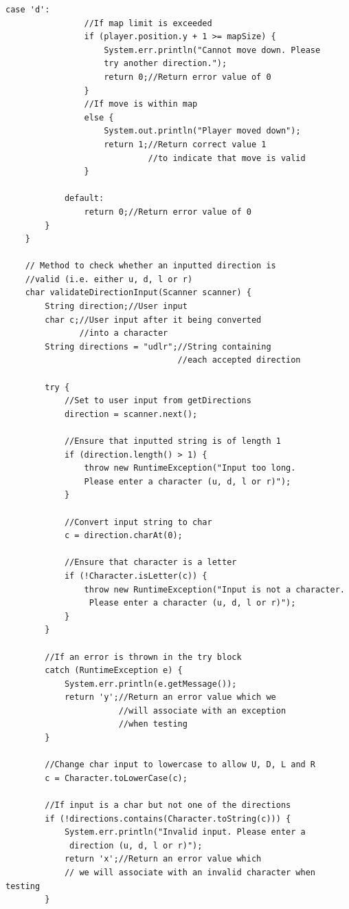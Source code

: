 \documentclass[a4paper,12pt]{extarticle}
\begin{document}
\begin{lstlisting}[caption=The initial code of the Game class, label=amb]
            case 'd':
                //If map limit is exceeded
                if (player.position.y + 1 >= mapSize) {
                    System.err.println("Cannot move down. Please 
                    try another direction.");
                    return 0;//Return error value of 0
                }
                //If move is within map
                else {
                    System.out.println("Player moved down");
                    return 1;//Return correct value 1 
                             //to indicate that move is valid
                }

            default:
                return 0;//Return error value of 0
        }
    }

    // Method to check whether an inputted direction is 
    //valid (i.e. either u, d, l or r)
    char validateDirectionInput(Scanner scanner) {
        String direction;//User input
        char c;//User input after it being converted 
        	   //into a character
        String directions = "udlr";//String containing 
                                   //each accepted direction

        try {
            //Set to user input from getDirections
            direction = scanner.next();

            //Ensure that inputted string is of length 1
            if (direction.length() > 1) {
                throw new RuntimeException("Input too long. 
                Please enter a character (u, d, l or r)");
            }

            //Convert input string to char
            c = direction.charAt(0);

            //Ensure that character is a letter
            if (!Character.isLetter(c)) {
                throw new RuntimeException("Input is not a character.
                 Please enter a character (u, d, l or r)");
            }
        }

        //If an error is thrown in the try block
        catch (RuntimeException e) {
            System.err.println(e.getMessage());
            return 'y';//Return an error value which we 
            		   //will associate with an exception 
            		   //when testing
        }

        //Change char input to lowercase to allow U, D, L and R
        c = Character.toLowerCase(c);

        //If input is a char but not one of the directions
        if (!directions.contains(Character.toString(c))) {
            System.err.println("Invalid input. Please enter a
             direction (u, d, l or r)");
            return 'x';//Return an error value which
            // we will associate with an invalid character when testing
        }


\end{lstlisting}
\end{document}
